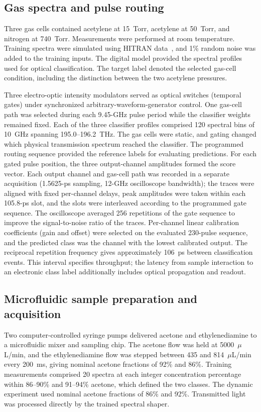 \documentclass[11pt]{article}
\begin{document}
\subsection*{Gas spectra and pulse routing}
Three gas cells contained acetylene at 15~Torr, acetylene at 50~Torr, and nitrogen at 740~Torr. Measurements were performed at room temperature. Training spectra were simulated using HITRAN data~\cite{gordon2022}, and 1\% random noise was added to the training inputs. The digital model provided the spectral profiles used for optical classification. The target label denoted the selected gas-cell condition, including the distinction between the two acetylene pressures.

Three electro-optic intensity modulators served as optical switches (temporal gates) under synchronized arbitrary-waveform-generator control. One gas-cell path was selected during each 9.45-GHz pulse period while the classifier weights remained fixed. Each of the three classifier profiles comprised 120 spectral bins of 10~GHz spanning 195.0--196.2~THz. The gas cells were static, and gating changed which physical transmission spectrum reached the classifier. The programmed routing sequence provided the reference labels for evaluating predictions. For each gated pulse position, the three output-channel amplitudes formed the score vector. Each output channel and gas-cell path was recorded in a separate acquisition (1.5625-ps sampling, 12-GHz oscilloscope bandwidth); the traces were aligned with fixed per-channel delays, peak amplitudes were taken within each 105.8-ps slot, and the slots were interleaved according to the programmed gate sequence. The oscilloscope averaged 256 repetitions of the gate sequence to improve the signal-to-noise ratio of the traces. Per-channel linear calibration coefficients (gain and offset) were selected on the evaluated 230-pulse sequence, and the predicted class was the channel with the lowest calibrated output. The reciprocal repetition frequency gives approximately 106~ps between classification events. This interval specifies throughput; the latency from sample interaction to an electronic class label additionally includes optical propagation and readout.

\subsection*{Microfluidic sample preparation and acquisition}
Two computer-controlled syringe pumps delivered acetone and ethylenediamine to a microfluidic mixer and sampling chip. The acetone flow was held at 5000~$\mu$L/min, and the ethylenediamine flow was stepped between 435 and 814~$\mu$L/min every 200~ms, giving nominal acetone fractions of 92\% and 86\%. Training measurements comprised 20 spectra at each integer concentration percentage within 86--90\% and 91--94\% acetone, which defined the two classes. The dynamic experiment used nominal acetone fractions of 86\% and 92\%. Transmitted light was processed directly by the trained spectral shaper.
\end{document}
